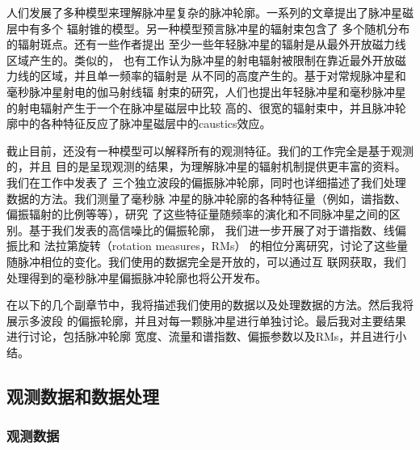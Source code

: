 人们发展了多种模型来理解脉冲星复杂的脉冲轮廓。一系列的文章提出了脉冲星磁层中有多个
辐射锥的模型\supercite{Rankin83,Kramer94b,Gupta03}。另一种模型预言脉冲星的辐射束包含了
多个随机分布的辐射斑点\supercite{Lyne88,Manchester95b,Han01}。还有一些作者提出
至少一些年轻脉冲星的辐射是从最外开放磁力线区域产生的\supercite{Johnston06}。类似的，
也有工作认为脉冲星的射电辐射被限制在靠近最外开放磁力线的区域，并且单一频率的辐射是
从不同的高度产生的\supercite{Kara07}。基于对常规脉冲星和毫秒脉冲星射电的伽马射线辐
射束的研究，人们也提出年轻脉冲星和毫秒脉冲星的射电辐射产生于一个在脉冲星磁层中比较
高的、很宽的辐射束中，并且脉冲轮廓中的各种特征反应了脉冲星磁层中的caustics效应\supercite{Manchester05b,Ravi10}。

截止目前，还没有一种模型可以解释所有的观测特征。我们的工作完全是基于观测的，并且
目的是呈现观测的结果，为理解脉冲星的辐射机制提供更丰富的资料。我们在工作中发表了
三个独立波段的偏振脉冲轮廓，同时也详细描述了我们处理数据的方法。我们测量了毫秒脉
冲星的脉冲轮廓的各种特征量（例如，谱指数、偏振辐射的比例等等），研究
了这些特征量随频率的演化和不同脉冲星之间的区别。基于我们发表的高信噪比的偏振轮廓，
我们进一步开展了对于谱指数\supercite{Lyne88,Kramer94a,Manchester04,Chen07}、线偏振比和
法拉第旋转（rotation measures，RMs）\supercite{Ramach04,Han06,Noutsos09}
的相位分离研究，讨论了这些量随脉冲相位的变化。我们使用的数据完全是开放的，可以通过互
联网获取，我们处理得到的毫秒脉冲星偏振脉冲轮廓也将公开发布。

在以下的几个副章节中，我将描述我们使用的数据以及处理数据的方法。然后我将展示多波段
的偏振轮廓，并且对每一颗脉冲星进行单独讨论。最后我对主要结果进行讨论，包括脉冲轮廓
宽度、流量和谱指数、偏振参数以及RMs，并且进行小结。

\subsection{观测数据和数据处理}

\subsubsection{观测数据}

